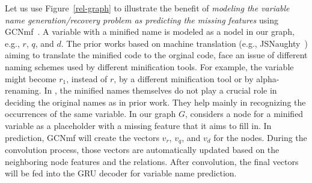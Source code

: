 Let us use Figure~\ref{rel-graph} to illustrate the benefit of {\em
modeling the variable name generation/recovery problem as predicting
the missing features} using GCNmf~\cite{GCNmf}. A variable with a
minified name is modeled as a nodel in our graph, e.g., $r$, $q$, and
$d$.  The prior works based on machine translation (e.g.,
JSNaughty~\cite{JSNaughty2017}) aiming to translate the minified code
to the orginal code, face an issue of different naming schemes used
by different minification tools. For example, the
variable  might become $r_1$, instead of $r$, by a
different minification tool or by alpha-renaming. In {\tool}, the
minified names themselves do not play a crucial role in deciding the
original names as in prior work. They help mainly in recognizing the
occurrences of the same variable. In our graph $G$, {\tool}
considers a node for a minified variable as a placeholder with a
missing feature that it aims to fill in.  In prediction, GCNmf will
create the vectors $v_r$, $v_q$, and $v_d$ for the nodes. During the
convolution process, those vectors are automatically updated based on
the neighboring node features and the relations. After convolution,
the final vectors will be fed into the GRU decoder for variable name
prediction.


